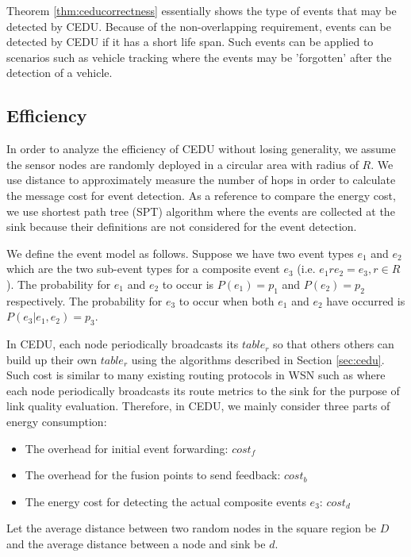 Theorem \ref{thm:ceducorrectness} essentially shows the type of events that may be detected by CEDU. Because of the non-overlapping requirement, events can be detected by CEDU if it has a short life span. Such events can be applied to scenarios such as vehicle tracking where the events may be 'forgotten' after the detection of a vehicle.

\subsection{Efficiency}
In order to analyze the efficiency of CEDU without losing generality, we assume the sensor nodes are randomly deployed in a circular area with radius of \(R\). We use distance to approximately measure the number of hops in order to calculate the message cost for event detection. As a reference to compare the energy cost, we use shortest path tree (SPT) algorithm where the events are collected at the sink because their definitions are not considered for the event detection.

We define the event model as follows. Suppose we have two event types \(e_1\) and \(e_2\) which are the two sub-event types for a composite event \(e_3\) (i.e. \(e_1re_2=e_3, r\in R\)). The probability for \(e_1\) and \(e_2\) to occur is \(P(e_1)=p_1\) and \(P(e_2)=p_2\) respectively. The probability for \(e_3\) to occur when both \(e_1\) and \(e_2\) have occurred is \(P(e_3|e_1, e_2)=p_3\).

In CEDU, each node periodically broadcasts its \(table_r\) so that others others can build up their own \(table_r\) using the algorithms described in Section \ref{sec:cedu}. Such cost is similar to many existing routing protocols in WSN such as \cite{rssiroute} where each node periodically broadcasts its route metrics to the sink for the purpose of link quality evaluation. Therefore, in CEDU, we mainly consider three parts of energy consumption:
\begin{itemize}
\item The overhead for initial event forwarding: \(cost_f\)
\item The overhead for the fusion points to send feedback: \(cost_b\)
\item The energy cost for detecting the actual composite events \(e_3\): \(cost_d\)
\end{itemize}

Let the average distance between two random nodes in the square region be \(D\) and the average distance between a node and sink be \(d\). 
\begin{comment}
Then:
\begin{equation*}
D=\frac{2+\sqrt{2}+5\times ln(1+\sqrt{}2)}{15}\times|N|
\end{equation*}
Let the average distance between the event source and the event fusion points be \(d\).
\end{comment}

